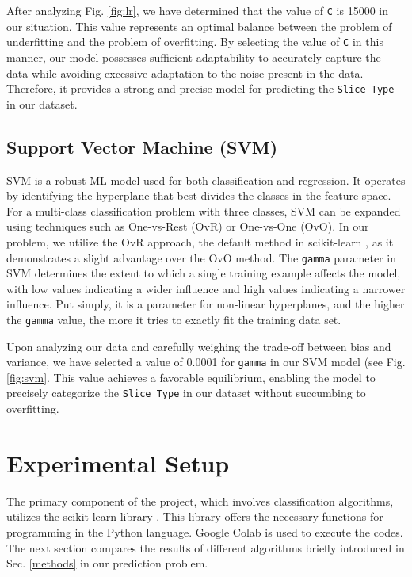 \documentclass[conference]{IEEEtran}
\begin{document}
After analyzing Fig. \ref{fig:lr}, we have determined that the value of \texttt{\footnotesize C} is 15000 in our situation. This value represents an optimal balance between the problem of underfitting and the problem of overfitting. By selecting the value of \texttt{\footnotesize C} in this manner, our model possesses sufficient adaptability to accurately capture the data while avoiding excessive adaptation to the noise present in the data. Therefore, it provides a strong and precise model for predicting the \texttt{\footnotesize Slice Type} in our dataset.

\subsection{Support Vector Machine (SVM)} %
SVM is a robust ML model used for both classification and regression. It operates by identifying the hyperplane that best divides the classes in the feature space. For a multi-class classification problem with three classes, SVM can be expanded using techniques such as One-vs-Rest (OvR) or One-vs-One (OvO). In our problem, we utilize the OvR approach, the default method in scikit-learn \cite{scikit-learn}, as it demonstrates a slight advantage over the OvO method. The \texttt{\footnotesize gamma} parameter in SVM determines the extent to which a single training example affects the model, with low values indicating a wider influence and high values indicating a narrower influence. Put simply, it is a parameter for non-linear hyperplanes, and the higher the \texttt{\footnotesize gamma} value, the more it tries to exactly fit the training data set.

Upon analyzing our data and carefully weighing the trade-off between bias and variance, we have selected a value of 0.0001 for \texttt{\footnotesize gamma} in our SVM model (see Fig. \ref{fig:svm}. This value achieves a favorable equilibrium, enabling the model to precisely categorize the \texttt{\footnotesize Slice Type} in our dataset without succumbing to overfitting.

\section{Experimental Setup} \label{setup}%
The primary component of the project, which involves classification algorithms, utilizes the scikit-learn library \cite{scikit-learn}. This library offers the necessary functions for programming in the Python language. Google Colab is used to execute the codes. The next section compares the results of different algorithms briefly introduced in Sec. \ref{methods} in our prediction problem.
\end{document}
